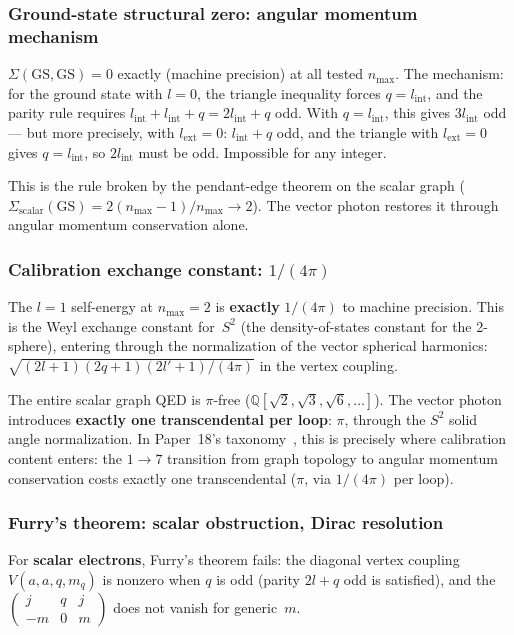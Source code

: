 \documentclass[11pt]{article}
\begin{document}
\subsubsection{Ground-state structural zero: angular momentum mechanism}

$\Sigma(\mathrm{GS}, \mathrm{GS}) = 0$ exactly (machine precision) at
all tested $n_{\max}$.  The mechanism: for the ground state with $l = 0$,
the triangle inequality forces $q = l_{\mathrm{int}}$, and the parity
rule requires $l_{\mathrm{int}} + l_{\mathrm{int}} + q =
2l_{\mathrm{int}} + q$ odd.  With $q = l_{\mathrm{int}}$, this gives
$3l_{\mathrm{int}}$ odd --- but more precisely, with $l_{\mathrm{ext}} = 0$:
$l_{\mathrm{int}} + q$ odd, and the triangle with $l_{\mathrm{ext}} = 0$
gives $q = l_{\mathrm{int}}$, so $2l_{\mathrm{int}}$ must be odd.
Impossible for any integer.

This is the rule broken by the pendant-edge theorem on the scalar graph
($\Sigma_{\mathrm{scalar}}(\mathrm{GS}) = 2(n_{\max}-1)/n_{\max} \to 2$).
The vector photon restores it through angular momentum conservation alone.

\subsubsection{Calibration exchange constant: $1/(4\pi)$}

The $l = 1$ self-energy at $n_{\max} = 2$ is \textbf{exactly} $1/(4\pi)$
to machine precision.  This is the Weyl exchange constant for~$S^2$
(the density-of-states constant for the 2-sphere), entering through the
normalization of the vector spherical harmonics:
$\sqrt{(2l+1)(2q+1)(2l'+1)/(4\pi)}$ in the vertex coupling.

The entire scalar graph QED is $\pi$-free
($\mathbb{Q}[\sqrt{2}, \sqrt{3}, \sqrt{6}, \ldots]$).  The vector
photon introduces \textbf{exactly one transcendental per loop}: $\pi$,
through the $S^2$ solid angle normalization.  In Paper~18's
taxonomy~\cite{paper18}, this is precisely where calibration content
enters: the $1 \to 7$ transition from graph topology to angular momentum
conservation costs exactly one transcendental ($\pi$, via $1/(4\pi)$
per loop).

\subsubsection{Furry's theorem: scalar obstruction, Dirac resolution}

For \textbf{scalar electrons}, Furry's theorem fails: the diagonal vertex
coupling $V(a, a, q, m_q)$ is nonzero when $q$ is odd
(parity $2l + q$ odd is satisfied), and the
$\left(\begin{smallmatrix} j & q & j \\ -m & 0 & m\end{smallmatrix}\right)$
does not vanish for generic~$m$.
\end{document}
